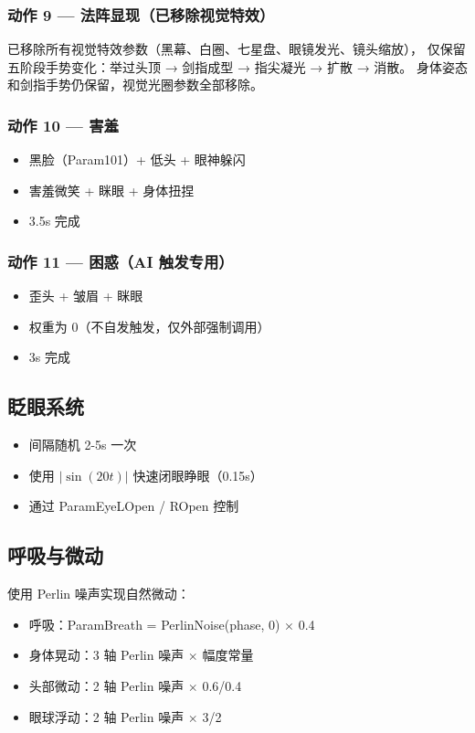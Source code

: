 \documentclass[12pt,a4paper]{ctexart}
\begin{document}
\subsubsection{动作 9 --- 法阵显现（已移除视觉特效）}
已移除所有视觉特效参数（黑幕、白圈、七星盘、眼镜发光、镜头缩放），
仅保留五阶段手势变化：举过头顶 → 剑指成型 → 指尖凝光 → 扩散 → 消散。
身体姿态和剑指手势仍保留，视觉光圈参数全部移除。

\subsubsection{动作 10 --- 害羞}
\begin{itemize}
    \item 黑脸（Param101）+ 低头 + 眼神躲闪
    \item 害羞微笑 + 眯眼 + 身体扭捏
    \item 3.5s 完成
\end{itemize}

\subsubsection{动作 11 --- 困惑（AI 触发专用）}
\begin{itemize}
    \item 歪头 + 皱眉 + 眯眼
    \item 权重为 0（不自发触发，仅外部强制调用）
    \item 3s 完成
\end{itemize}

\subsection{眨眼系统}

\begin{itemize}
    \item 间隔随机 2-5s 一次
    \item 使用 $|\sin(20t)|$ 快速闭眼睁眼（0.15s）
    \item 通过 ParamEyeLOpen / ROpen 控制
\end{itemize}

\subsection{呼吸与微动}

使用 Perlin 噪声实现自然微动：
\begin{itemize}
    \item 呼吸：ParamBreath = PerlinNoise(phase, 0) $\times$ 0.4
    \item 身体晃动：3 轴 Perlin 噪声 $\times$ 幅度常量
    \item 头部微动：2 轴 Perlin 噪声 $\times$ 0.6/0.4
    \item 眼球浮动：2 轴 Perlin 噪声 $\times$ 3/2
\end{itemize}
\end{document}
